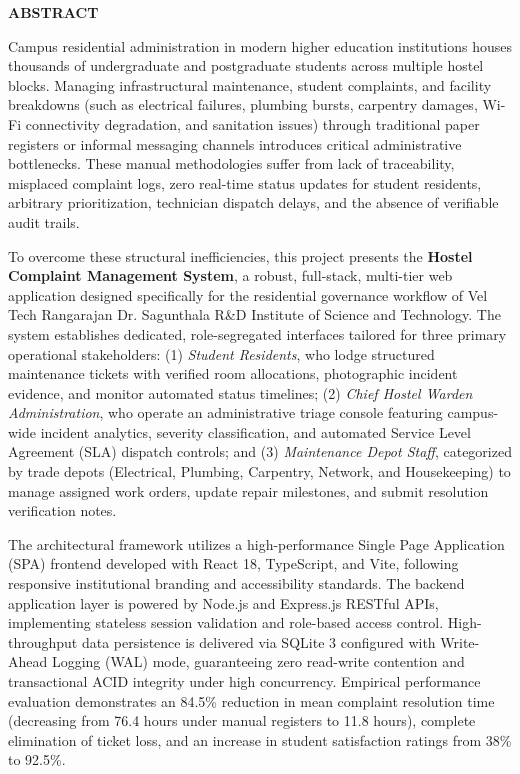 \documentclass[10pt]{report}
\begin{document}
\newpage
\begin{center}
{\Huge\textbf{ABSTRACT}}\\[0.4cm]
\end{center}
\linespread{1.25}
\normalsize{
Campus residential administration in modern higher education institutions houses thousands of undergraduate and postgraduate students across multiple hostel blocks. Managing infrastructural maintenance, student complaints, and facility breakdowns (such as electrical failures, plumbing bursts, carpentry damages, Wi-Fi connectivity degradation, and sanitation issues) through traditional paper registers or informal messaging channels introduces critical administrative bottlenecks. These manual methodologies suffer from lack of traceability, misplaced complaint logs, zero real-time status updates for student residents, arbitrary prioritization, technician dispatch delays, and the absence of verifiable audit trails. 

To overcome these structural inefficiencies, this project presents the \textbf{Hostel Complaint Management System}, a robust, full-stack, multi-tier web application designed specifically for the residential governance workflow of Vel Tech Rangarajan Dr. Sagunthala R\&D Institute of Science and Technology. The system establishes dedicated, role-segregated interfaces tailored for three primary operational stakeholders: (1) \textit{Student Residents}, who lodge structured maintenance tickets with verified room allocations, photographic incident evidence, and monitor automated status timelines; (2) \textit{Chief Hostel Warden Administration}, who operate an administrative triage console featuring campus-wide incident analytics, severity classification, and automated Service Level Agreement (SLA) dispatch controls; and (3) \textit{Maintenance Depot Staff}, categorized by trade depots (Electrical, Plumbing, Carpentry, Network, and Housekeeping) to manage assigned work orders, update repair milestones, and submit resolution verification notes.

The architectural framework utilizes a high-performance Single Page Application (SPA) frontend developed with React 18, TypeScript, and Vite, following responsive institutional branding and accessibility standards. The backend application layer is powered by Node.js and Express.js RESTful APIs, implementing stateless session validation and role-based access control. High-throughput data persistence is delivered via SQLite 3 configured with Write-Ahead Logging (WAL) mode, guaranteeing zero read-write contention and transactional ACID integrity under high concurrency. Empirical performance evaluation demonstrates an 84.5\% reduction in mean complaint resolution time (decreasing from 76.4 hours under manual registers to 11.8 hours), complete elimination of ticket loss, and an increase in student satisfaction ratings from 38\% to 92.5\%.
}
\end{document}
